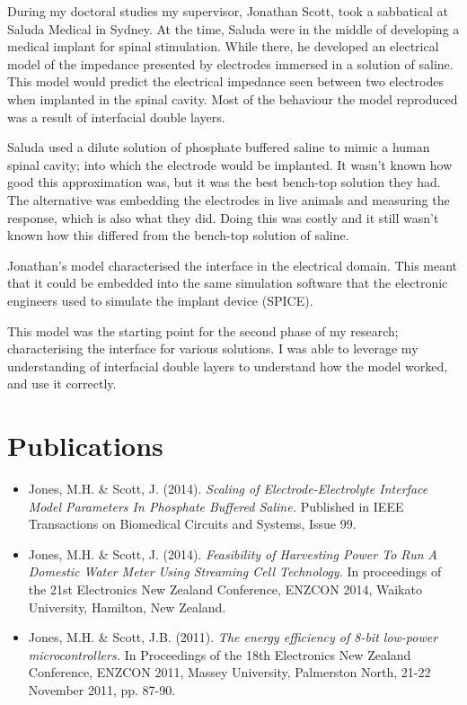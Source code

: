   During my doctoral studies my supervisor, Jonathan Scott, took a sabbatical at Saluda Medical in Sydney.
  At the time, Saluda were in the middle of developing a medical implant for spinal stimulation.
  While there, he developed an electrical model of the impedance presented by electrodes immersed in a solution of saline.
  This model would predict the electrical impedance seen between two electrodes when implanted in the spinal cavity.
  Most of the behaviour the model reproduced was a result of interfacial double layers.

  Saluda used a dilute solution of phosphate buffered saline to mimic a human spinal cavity; into which the electrode would be implanted.
  It wasn't known how good this approximation was, but it was the best bench-top solution they had.
  The alternative was embedding the electrodes in live animals and measuring the response, which is also what they did.
  Doing this was costly and it still wasn't known how this differed from the bench-top solution of saline.

  Jonathan's model characterised the interface in the electrical domain.
  This meant that it could be embedded into the same simulation software that the electronic engineers used to simulate the implant device (SPICE).

  This model was the starting point for the second phase of my research; characterising the interface for various solutions.
  I was able to leverage my understanding of interfacial double layers to understand how the model worked, and use it correctly.

\section{Publications}

  \begin{itemize}
    \item Jones, M.H. \& Scott, J. (2014). \emph{Scaling of Electrode-Electrolyte Interface Model Parameters In Phosphate Buffered Saline.} Published in IEEE Transactions on Biomedical Circuits and Systems, Issue 99.
    \item Jones, M.H. \& Scott, J. (2014). \emph{Feasibility of Harvesting Power To Run A Domestic Water Meter Using Streaming Cell Technology.} In proceedings of the 21st Electronics New Zealand Conference, ENZCON 2014, Waikato University, Hamilton, New Zealand.
    \item Jones, M.H. & Scott, J.B. (2011). \emph{The energy efficiency of 8-bit low-power microcontrollers.} In Proceedings of the 18th Electronics New Zealand Conference, ENZCON 2011, Massey University, Palmerston North, 21-22 November 2011, pp. 87-90.
  \end{itemize}

